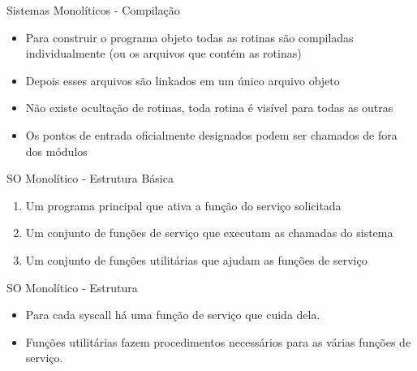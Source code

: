 \documentclass{beamer}
\begin{document}
\begin{frame}{Sistemas Monolíticos - Compilação}
    \begin{itemize}
        \item Para construir o programa objeto todas as rotinas são compiladas individualmente (ou os arquivos que contém as rotinas)
        \item Depois esses arquivos são linkados em um único arquivo objeto
        \item Não existe ocultação de rotinas, toda rotina é visível para todas as outras
        \item Os pontos de entrada oficialmente designados podem ser chamados de fora dos módulos
    \end{itemize}
\end{frame}
\begin{frame}{SO Monolítico - Estrutura Básica}
    \begin{enumerate}
        \item Um programa principal que ativa a função do serviço solicitada
        \item Um conjunto de funções de serviço que executam as chamadas do sistema
        \item Um conjunto de funções utilitárias que ajudam as funções de serviço
    \end{enumerate}
\end{frame}

\begin{frame}{SO Monolítico - Estrutura}
    \begin{itemize}
        \item Para cada syscall há uma função de serviço que cuida dela.
        \item Funções utilitárias fazem procedimentos necessários para as várias funções de serviço.
    \end{itemize}
\end{frame}
\end{document}
